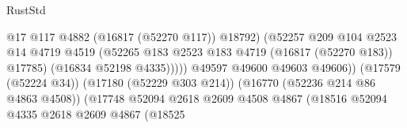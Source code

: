 \begin{lexlean}{RustStd}
\begin{coremodule}
{\begin{coremodule}
{{{{{{{{{{{{{{{{{{{{{{{{{{{{{{{{{{{{{{{{{{{{{{{{{{{{{{{                                                            @17
                                                            @117
                                                            @4882
                                                            (@16817 (@52270 @117))
                                                            @18792)
                                                          (@52257
                                                            @209
                                                            @104
                                                            @2523
                                                            @14
                                                            @4719
                                                            @4519
                                                            (@52265
                                                              @183
                                                              @2523
                                                              @183
                                                              @4719
                                                              (@16817 (@52270 @183))
                                                              @17785)
                                                            (@16834 @52198 @4335)))))
                                                    @49597
                                                    @49600
                                                    @49603
                                                    @49606))
                                                (@17579 (@52224 @34))
                                                (@17180 (@52229 @303 @214))
                                                (@16770 (@52236 @214 @86 @4863 @4508))
                                                (@17748
                                                  @52094
                                                  @2618
                                                  @2609
                                                  @4508
                                                  @4867
                                                  (@18516
                                                    @52094
                                                    @4335
                                                    @2618
                                                    @2609
                                                    @4867
                                                    (@18525
}}}}}}}}}}}}}}}}}}}}}}}}}}}}}}}}}}}}}}}}}}}}}}}}}}}}}}}
\end{coremodule}}
\end{coremodule}
\end{lexlean}
